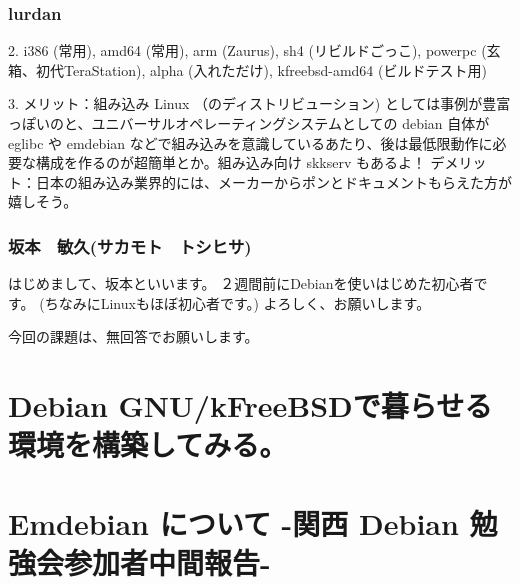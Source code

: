 \documentclass[cjk,dvipdfmx,12pt,%
hyperref={bookmarks=true,bookmarksnumbered=true,bookmarksopen=false,%
colorlinks=false,%
pdftitle={第38回関西Debian勉強会},%
pdfauthor={倉敷・のがた・佐々木},%
pdfsubject={資料},%
}]{beamer}
\begin{document}
\begin{frame}[fragile]
\frametitle{ lurdan }


{\small
\begin{verbatimtab}
2. i386 (常用), amd64 (常用),  arm (Zaurus), sh4 (リビルドごっこ), powerpc (玄箱、初代TeraStation), alpha (入れただけ), kfreebsd-amd64 (ビルドテスト用)

3. メリット：組み込み Linux （のディストリビューション) としては事例が豊富っぽいのと、ユニバーサルオペレーティングシステムとしての debian 自体が eglibc や emdebian などで組み込みを意識しているあたり、後は最低限動作に必要な構成を作るのが超簡単とか。組み込み向け skkserv もあるよ！
   デメリット：日本の組み込み業界的には、メーカーからポンとドキュメントもらえた方が嬉しそう。
\end{verbatimtab}
}

\end{frame}

\begin{frame}[fragile]
\frametitle{ 坂本　敏久(サカモト　トシヒサ) }



\begin{verbatimtab}
はじめまして、坂本といいます。
２週間前にDebianを使いはじめた初心者です。
(ちなみにLinuxもほぼ初心者です。)
よろしく、お願いします。

今回の課題は、無回答でお願いします。
\end{verbatimtab}

\end{frame}





\section{Debian GNU/kFreeBSDで暮らせる環境を構築してみる。}





\section{Emdebian について -関西 Debian 勉強会参加者中間報告-}
\end{document}

